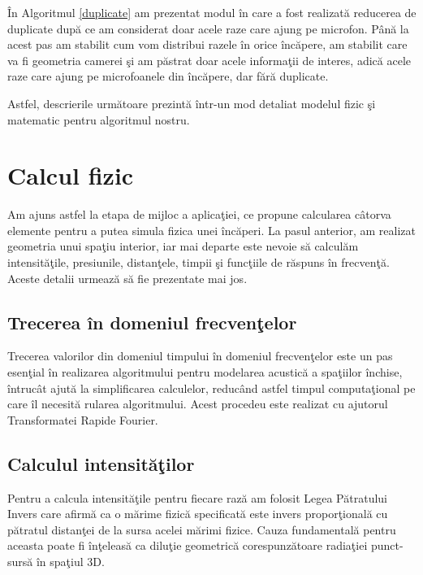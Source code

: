 	\^{I}n Algoritmul \ref{duplicate} am prezentat modul \^{i}n care a fost realizat\u{a} reducerea de duplicate dup\u{a} ce am considerat doar acele raze care ajung pe microfon. P\^{a}n\u{a} la acest pas am stabilit cum vom distribui razele \^{i}n orice \^{i}nc\u{a}pere, am stabilit care va fi geometria camerei \c{s}i am p\u{a}strat doar acele informa\c{t}ii de interes, adic\u{a} acele raze care ajung pe microfoanele din \^{i}nc\u{a}pere, dar f\u{a}r\u{a} duplicate. 
	\bigskip
	
	Astfel, descrierile urm\u{a}toare prezint\u{a} \^{i}ntr-un mod detaliat modelul fizic \c{s}i matematic pentru algoritmul nostru.

\section{Calcul fizic}

	Am ajuns astfel la etapa de mijloc a aplica\c{t}iei, ce propune calcularea c\^{a}torva elemente pentru a putea simula fizica unei \^{i}nc\u{a}peri. La pasul anterior, am realizat geometria unui spa\c{t}iu interior, iar mai departe este nevoie s\u{a} calcul\u{a}m intensit\u{a}\c{t}ile, presiunile, distan\c{t}ele, timpii \c{s}i func\c{t}iile de r\u{a}spuns \^{i}n frecven\c{t}\u{a}. Aceste detalii urmeaz\u{a} s\u{a} fie prezentate mai jos.
	
\subsection{Trecerea \^{i}n domeniul frecven\c{t}elor}
	
	Trecerea valorilor din domeniul timpului \^{i}n domeniul frecven\c{t}elor este un pas esen\c{t}ial \^{i}n realizarea algoritmului pentru modelarea acustic\u{a} a spa\c{t}iilor \^{i}nchise, \^{i}ntruc\^{a}t ajut\u{a} la simplificarea calculelor, reduc\^{a}nd astfel timpul computa\c{t}ional pe care \^{i}l necesit\u{a} rularea algoritmului. Acest procedeu este realizat cu ajutorul Transformatei Rapide Fourier.
	
\subsection{Calculul intensit\u{a}\c{t}ilor}

	Pentru a calcula intensit\u{a}\c{t}ile pentru fiecare raz\u{a} am folosit Legea P\u{a}tratului Invers care afirm\u{a} ca o m\u{a}rime fizic\u{a} specificat\u{a} este invers propor\c{t}ional\u{a} cu p\u{a}tratul distan\c{t}ei de la sursa acelei m\u{a}rimi fizice. Cauza fundamental\u{a} pentru aceasta poate fi \^{i}n\c{t}eleas\u{a} ca dilu\c{t}ie geometric\u{a} corespunz\u{a}toare radia\c{t}iei punct-surs\u{a} \^{i}n spa\c{t}iul 3D.
	\bigskip
	
